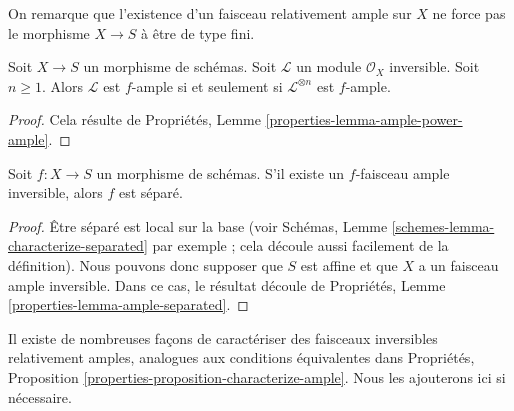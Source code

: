 \noindent
On remarque que l'existence d'un faisceau relativement ample sur $X$ ne
force pas le morphisme $X \to S$ à être de type fini.

\begin{lemma}
\label{lemma-ample-power-ample}
Soit $X \to S$ un morphisme de schémas.
Soit $\mathcal{L}$ un module $\mathcal{O}_X$ inversible. Soit $n \geq 1$.
Alors $\mathcal{L}$ est $f$-ample si et seulement
si $\mathcal{L}^{\otimes n}$ est $f$-ample.
\end{lemma}

\begin{proof}
Cela résulte de Propriétés, Lemme \ref{properties-lemma-ample-power-ample}.
\end{proof}

\begin{lemma}
\label{lemma-relatively-ample-separated}
Soit $f : X \to S$ un morphisme de schémas. S'il existe
un $f$-faisceau ample inversible, alors $f$
est séparé.
\end{lemma}

\begin{proof}
Être séparé est local sur la base (voir
Schémas, Lemme \ref{schemes-lemma-characterize-separated} par exemple ; cela découle aussi facilement
de la définition). Nous pouvons donc
supposer que $S$ est affine et
que $X$ a un faisceau ample inversible.
Dans ce cas,
le résultat découle de Propriétés, Lemme \ref{properties-lemma-ample-separated}.
\end{proof}

\noindent
Il existe de nombreuses façons de caractériser des faisceaux inversibles
relativement amples, analogues aux conditions
équivalentes dans Propriétés, Proposition \ref{properties-proposition-characterize-ample}. Nous les
ajouterons ici si nécessaire.

